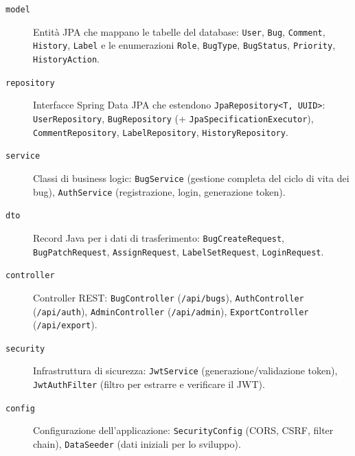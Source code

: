 \begin{description}
    \item[\texttt{model}] Entità JPA che mappano le tabelle del database:
    \texttt{User}, \texttt{Bug}, \texttt{Comment}, \texttt{History}, \texttt{Label}
    e le enumerazioni \texttt{Role}, \texttt{BugType}, \texttt{BugStatus},
    \texttt{Priority}, \texttt{HistoryAction}.

    \item[\texttt{repository}] Interfacce Spring Data JPA che estendono
    \texttt{JpaRepository<T, UUID>}:
    \texttt{UserRepository}, \texttt{BugRepository} (+ \texttt{JpaSpecificationExecutor}),
    \texttt{CommentRepository}, \texttt{LabelRepository}, \texttt{HistoryRepository}.

    \item[\texttt{service}] Classi di business logic:
    \texttt{BugService} (gestione completa del ciclo di vita dei bug),
    \texttt{AuthService} (registrazione, login, generazione token).

    \item[\texttt{dto}] Record Java per i dati di trasferimento:
    \texttt{BugCreateRequest}, \texttt{BugPatchRequest}, \texttt{AssignRequest},
    \texttt{LabelSetRequest}, \texttt{LoginRequest}.

    \item[\texttt{controller}] Controller REST:
    \texttt{BugController} (\texttt{/api/bugs}),
    \texttt{AuthController} (\texttt{/api/auth}),
    \texttt{AdminController} (\texttt{/api/admin}),
    \texttt{ExportController} (\texttt{/api/export}).

    \item[\texttt{security}] Infrastruttura di sicurezza:
    \texttt{JwtService} (generazione/validazione token),
    \texttt{JwtAuthFilter} (filtro per estrarre e verificare il JWT).

    \item[\texttt{config}] Configurazione dell'applicazione:
    \texttt{SecurityConfig} (CORS, CSRF, filter chain),
    \texttt{DataSeeder} (dati iniziali per lo sviluppo).
\end{description}

